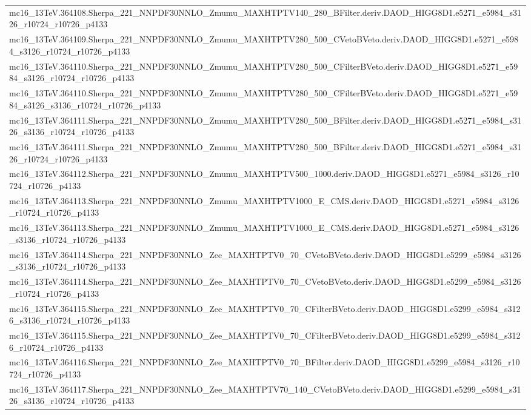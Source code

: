 \begin{adjustwidth}{-3em}{-3em}
\begin{longtable}{l}
mc16\_13TeV.364108.Sherpa\_221\_NNPDF30NNLO\_Zmumu\_MAXHTPTV140\_280\_BFilter.deriv.DAOD\_HIGG8D1.e5271\_e5984\_s3126\_r10724\_r10726\_p4133 \\
mc16\_13TeV.364109.Sherpa\_221\_NNPDF30NNLO\_Zmumu\_MAXHTPTV280\_500\_CVetoBVeto.deriv.DAOD\_HIGG8D1.e5271\_e5984\_s3126\_r10724\_r10726\_p4133 \\
mc16\_13TeV.364110.Sherpa\_221\_NNPDF30NNLO\_Zmumu\_MAXHTPTV280\_500\_CFilterBVeto.deriv.DAOD\_HIGG8D1.e5271\_e5984\_s3126\_r10724\_r10726\_p4133 \\
mc16\_13TeV.364110.Sherpa\_221\_NNPDF30NNLO\_Zmumu\_MAXHTPTV280\_500\_CFilterBVeto.deriv.DAOD\_HIGG8D1.e5271\_e5984\_s3126\_s3136\_r10724\_r10726\_p4133 \\
mc16\_13TeV.364111.Sherpa\_221\_NNPDF30NNLO\_Zmumu\_MAXHTPTV280\_500\_BFilter.deriv.DAOD\_HIGG8D1.e5271\_e5984\_s3126\_s3136\_r10724\_r10726\_p4133 \\
mc16\_13TeV.364111.Sherpa\_221\_NNPDF30NNLO\_Zmumu\_MAXHTPTV280\_500\_BFilter.deriv.DAOD\_HIGG8D1.e5271\_e5984\_s3126\_r10724\_r10726\_p4133 \\
mc16\_13TeV.364112.Sherpa\_221\_NNPDF30NNLO\_Zmumu\_MAXHTPTV500\_1000.deriv.DAOD\_HIGG8D1.e5271\_e5984\_s3126\_r10724\_r10726\_p4133 \\
mc16\_13TeV.364113.Sherpa\_221\_NNPDF30NNLO\_Zmumu\_MAXHTPTV1000\_E\_CMS.deriv.DAOD\_HIGG8D1.e5271\_e5984\_s3126\_r10724\_r10726\_p4133 \\
mc16\_13TeV.364113.Sherpa\_221\_NNPDF30NNLO\_Zmumu\_MAXHTPTV1000\_E\_CMS.deriv.DAOD\_HIGG8D1.e5271\_e5984\_s3126\_s3136\_r10724\_r10726\_p4133 \\
mc16\_13TeV.364114.Sherpa\_221\_NNPDF30NNLO\_Zee\_MAXHTPTV0\_70\_CVetoBVeto.deriv.DAOD\_HIGG8D1.e5299\_e5984\_s3126\_s3136\_r10724\_r10726\_p4133 \\
mc16\_13TeV.364114.Sherpa\_221\_NNPDF30NNLO\_Zee\_MAXHTPTV0\_70\_CVetoBVeto.deriv.DAOD\_HIGG8D1.e5299\_e5984\_s3126\_r10724\_r10726\_p4133 \\
mc16\_13TeV.364115.Sherpa\_221\_NNPDF30NNLO\_Zee\_MAXHTPTV0\_70\_CFilterBVeto.deriv.DAOD\_HIGG8D1.e5299\_e5984\_s3126\_s3136\_r10724\_r10726\_p4133 \\
mc16\_13TeV.364115.Sherpa\_221\_NNPDF30NNLO\_Zee\_MAXHTPTV0\_70\_CFilterBVeto.deriv.DAOD\_HIGG8D1.e5299\_e5984\_s3126\_r10724\_r10726\_p4133 \\
mc16\_13TeV.364116.Sherpa\_221\_NNPDF30NNLO\_Zee\_MAXHTPTV0\_70\_BFilter.deriv.DAOD\_HIGG8D1.e5299\_e5984\_s3126\_r10724\_r10726\_p4133 \\
mc16\_13TeV.364117.Sherpa\_221\_NNPDF30NNLO\_Zee\_MAXHTPTV70\_140\_CVetoBVeto.deriv.DAOD\_HIGG8D1.e5299\_e5984\_s3126\_s3136\_r10724\_r10726\_p4133 \\

\end{longtable}
\end{adjustwidth}
